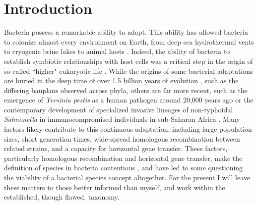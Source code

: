 \chapter{Introduction}
\ifpdf
    \graphicspath{{Introduction/IntroductionFigs/PNG/}{Introduction/IntroductionFigs/PDF/}{Introduction/IntroductionFigs/}}
\else
    \graphicspath{{Introduction/IntroductionFigs/EPS/}{Introduction/IntroductionFigs/}}
\fi

Bacteria possess a remarkable ability to adapt. This ability has allowed bacteria to colonize almost every environment on Earth, from deep sea hydrothermal vents \parencite{Jorgensen1992} to cryogenic brine lakes \parencite{Murray2012} to animal hosts \parencite{Finlay1997}. Indeed, the ability of bacteria to establish symbiotic relationships with host cells was a critical step in the origin of so-called ``higher" eukaryotic life \parencite{Sagan1967}. While the origins of some bacterial adaptations are buried in the deep time of over 1.5 billion years of evolution \parencite{Doolittle1996}, such as the differing bauplans observed across phyla, others are far more recent, such as the emergence of \textit{Yersinia pestis} as a human pathogen around 20,000 years ago \parencite{Achtman1999} or the contemporary development of specialized invasive lineages of non-typhoidal \textit{Salmonella} in immunocompromised individuals in sub-Saharan Africa \parencite{Feasey2012, Okoro2012}. Many factors likely contribute to this continuous adaptation, including large population sizes, short generation times, wide-spread homologous recombination between related strains, and a capacity for horizontal gene transfer. These factors, particularly homologous recombination and horizontal gene transfer, make the definition of species in bacteria contentious \parencite{Achtman2008, Doolittle2009}, and have led to some questioning the viability of a bacterial species concept altogether. For the present I will leave these matters to those better informed than myself, and work within the established, though flawed, taxonomy.

